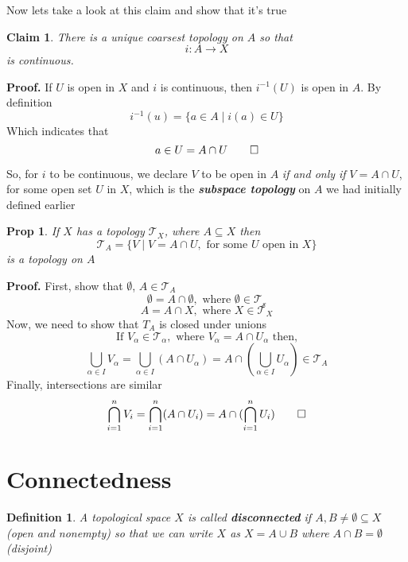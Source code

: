 \documentclass{article}
\newtheorem*{definition*}{Definition}
\newtheorem*{claim*}{Claim}
\newtheorem*{prop*}{Prop}
\begin{document}
\newpage
Now lets take a look at this claim and show that it's true
\begin{tcolorbox}[colback=claim!65]
    \begin{claim*}
    There is a unique coarsest topology on $A$ so that
    \[
    i: A \rightarrow X
    \]
    is continuous.
    \end{claim*}
    \textbf{Proof.} If $U$ is open in $X$ and $i$ is continuous, then $i^{-1}(U)$ is open in $A$. By definition
    \[
    i^{-1}(u) = \{a \in A \mid i(a) \in U\}
    \]
    Which indicates that 
    \[
    a \in U = A \cap U 
    \qed
    \]
\end{tcolorbox}

So, for $i$ to be continuous, we declare $V$ to be open in $A$ \textit{if and only if} $V = A \cap U$, for some open set $U$ in $X$, which is the \textit{\textbf{subspace topology}} on $A$ we had initially defined earlier

\begin{tcolorbox}[colback=prop!65]
    \begin{prop*}
    If $X$ has a topology $\mathcal{T}_X$, where $A \subseteq X$ then
    \[
    \mathcal{T}_A = \{V \mid V = A \cap U, \text{ for some $U$ open in $X$}\}
    \]
    is a topology on $A$
    \end{prop*}
    \textbf{Proof.} First, show that $\emptyset$, $A \in \mathcal T_A$
    \[
    \emptyset = A \cap \emptyset, \text{ where }\emptyset \in \mathcal{T_x}
    \]
    \[
    A = A \cap X, \text{ where } X \in \mathcal{T}_X
    \]
    Now, we need to show that $T_A$ is closed under unions
    \[
    \text{If } V_\alpha \in \mathcal{T}_\alpha, \text{ where } V_\alpha = A \cap U_\alpha \text{ then,}
    \] 
    \[
    \bigcup_{\alpha \in I} V_\alpha = \bigcup_{\alpha \in I} (A \cap U_\alpha) = A \cap (\bigcup_{\alpha \in I}U_\alpha) \in \mathcal{T}_A
    \]
    Finally, intersections are similar
    \[
    \bigcap^{n}_{i=1}V_i = \bigcap^{n}_{i=1}(A \cap U_i) = A \cap (\bigcap^{n}_{i=1}U_i) 
    \qed
    \]
\end{tcolorbox}

\newpage
\section*{Connectedness}

\begin{tcolorbox}[colback=definition!65]
    \begin{definition*}
        A topological space $X$ is called \textbf{disconnected} if $A, B \neq \emptyset \subseteq X$ (open and nonempty) so that we can write $X$ as $X = A \cup B$ where $A\cap B = \emptyset$ (disjoint)
    \end{definition*}
\end{tcolorbox}
\end{document}
